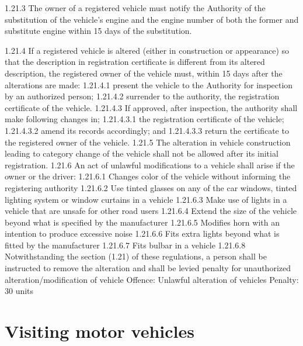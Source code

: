 \documentclass[
]{book}
\begin{document}
1.21.3 The owner of a registered vehicle must notify the Authority of the substitution of the vehicle's engine and the engine number of both the former and substitute engine within 15 days of the substitution.

1.21.4 If a registered vehicle is altered (either in construction or appearance) so that the description in registration certificate is different from its altered description, the registered owner of the vehicle must, within 15 days after the alterations are made:
1.21.4.1 present the vehicle to the Authority for inspection by an authorized person;
1.21.4.2 surrender to the authority, the registration certificate of the vehicle.
1.21.4.3 If approved, after inspection, the authority shall make following changes in;
1.21.4.3.1 the registration certificate of the vehicle;
1.21.4.3.2 amend its records accordingly; and
1.21.4.3.3 return the certificate to the registered owner of the vehicle.
1.21.5 The alteration in vehicle construction leading to category change of the vehicle shall not be allowed after its initial registration.
1.21.6 An act of unlawful modifications to a vehicle shall arise if the owner or the driver:
1.21.6.1 Changes color of the vehicle without informing the registering authority
1.21.6.2 Use tinted glasses on any of the car windows, tinted lighting system or window curtains in a vehicle
1.21.6.3 Make use of lights in a vehicle that are unsafe for other road users
1.21.6.4 Extend the size of the vehicle beyond what is specified by the manufacturer
1.21.6.5 Modifies horn with an intention to produce excessive noise
1.21.6.6 Fits extra lights beyond what is fitted by the manufacturer
1.21.6.7 Fits bulbar in a vehicle
1.21.6.8 Notwithstanding the section (1.21) of these regulations, a person shall be instructed to remove the alteration and shall be levied penalty for unauthorized alteration/modification of vehicle
Offence: Unlawful alteration of vehicles
Penalty: 30 units

\hypertarget{visiting-motor-vehicles}{%
\section{Visiting motor vehicles}\label{visiting-motor-vehicles}}
\end{document}

